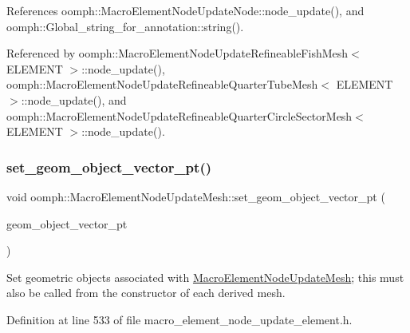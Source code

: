 References oomph\+::\+Macro\+Element\+Node\+Update\+Node\+::node\+\_\+update(), and oomph\+::\+Global\+\_\+string\+\_\+for\+\_\+annotation\+::string().



Referenced by oomph\+::\+Macro\+Element\+Node\+Update\+Refineable\+Fish\+Mesh$<$ E\+L\+E\+M\+E\+N\+T $>$\+::node\+\_\+update(), oomph\+::\+Macro\+Element\+Node\+Update\+Refineable\+Quarter\+Tube\+Mesh$<$ E\+L\+E\+M\+E\+N\+T $>$\+::node\+\_\+update(), and oomph\+::\+Macro\+Element\+Node\+Update\+Refineable\+Quarter\+Circle\+Sector\+Mesh$<$ E\+L\+E\+M\+E\+N\+T $>$\+::node\+\_\+update().

\mbox{\label{classoomph_1_1MacroElementNodeUpdateMesh_a4e9169d4a31189eb8e224e21f5f47383}} 
\subsubsection{\texorpdfstring{set\+\_\+geom\+\_\+object\+\_\+vector\+\_\+pt()}{set\_geom\_object\_vector\_pt()}}
{\footnotesize\ttfamily void oomph\+::\+Macro\+Element\+Node\+Update\+Mesh\+::set\+\_\+geom\+\_\+object\+\_\+vector\+\_\+pt (\begin{DoxyParamCaption}\item[{\hyperlink{classoomph_1_1Vector}{Vector}$<$ \hyperlink{classoomph_1_1GeomObject}{Geom\+Object} $\ast$$>$}]{geom\+\_\+object\+\_\+vector\+\_\+pt }\end{DoxyParamCaption})\hspace{0.3cm}{\ttfamily [inline]}}



Set geometric objects associated with \hyperlink{classoomph_1_1MacroElementNodeUpdateMesh}{Macro\+Element\+Node\+Update\+Mesh}; this must also be called from the constructor of each derived mesh. 



Definition at line 533 of file macro\+\_\+element\+\_\+node\+\_\+update\+\_\+element.\+h.



